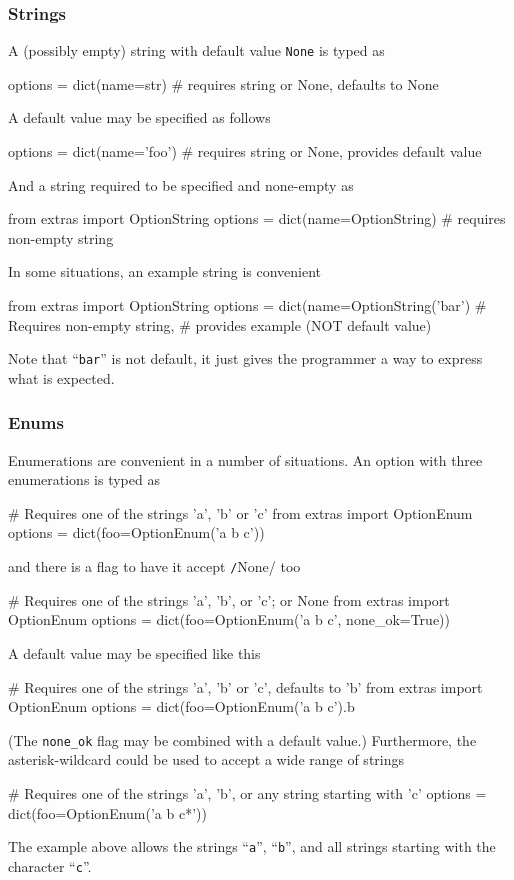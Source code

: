\subsubsection*{Strings}
A (possibly empty) string with default value \texttt{None} is typed as
\begin{python}
options = dict(name=str)     # requires string or None, defaults to None
\end{python}
A default value may be specified as follows
\begin{python}
options = dict(name='foo')   # requires string or None, provides default value
\end{python}
And a string required to be specified and none-empty as
\begin{python}
from extras import OptionString
options = dict(name=OptionString)       # requires non-empty string
\end{python}
In some situations, an example string is convenient
\begin{python}
from extras import OptionString
options = dict(name=OptionString('bar') # Requires non-empty string,
                                        # provides example (NOT default value)
\end{python}
Note that ``\texttt{bar}'' is not default, it just gives the
programmer a way to express what is expected.



\subsubsection*{Enums}
Enumerations are convenient in a number of situations.  An option with
three enumerations is typed as
\begin{python}
# Requires one of the strings 'a', 'b' or 'c'
from extras import OptionEnum
options = dict(foo=OptionEnum('a b c'))
\end{python}
and there is a flag to have it accept \texttt/None/ too
\begin{python}
# Requires one of the strings 'a', 'b', or 'c'; or None
from extras import OptionEnum
options = dict(foo=OptionEnum('a b c', none_ok=True))
\end{python}
A default value may be specified like this
\begin{python}
# Requires one of the strings 'a', 'b' or 'c', defaults to 'b'
from extras import OptionEnum
options = dict(foo=OptionEnum('a b c').b
\end{python}
(The \texttt{none\_ok} flag may be combined with a default value.)
Furthermore, the asterisk-wildcard could be used to accept a wide
range of strings
\begin{python}
# Requires one of the strings 'a', 'b', or any string starting with 'c'
options = dict(foo=OptionEnum('a b c*'))
\end{python}
The example above allows the strings ``\texttt{a}'', ``\texttt{b}'',
and all strings starting with the character ``\texttt{c}''.




